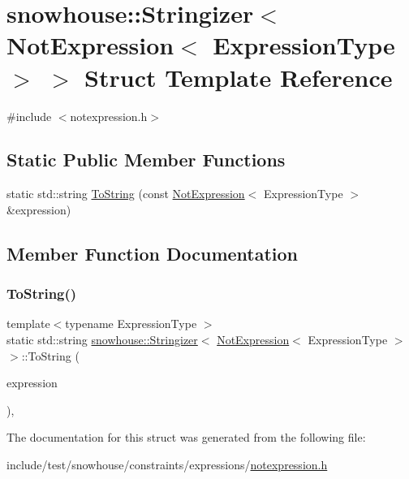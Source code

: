 \hypertarget{structsnowhouse_1_1Stringizer_3_01NotExpression_3_01ExpressionType_01_4_01_4}{}\section{snowhouse\+::Stringizer$<$ Not\+Expression$<$ Expression\+Type $>$ $>$ Struct Template Reference}
\label{structsnowhouse_1_1Stringizer_3_01NotExpression_3_01ExpressionType_01_4_01_4}


{\ttfamily \#include $<$notexpression.\+h$>$}

\subsection*{Static Public Member Functions}
\begin{DoxyCompactItemize}
\item 
static std\+::string \mbox{\hyperlink{structsnowhouse_1_1Stringizer_3_01NotExpression_3_01ExpressionType_01_4_01_4_a908c1fe0ea46f2ea3bcacea90009001f}{To\+String}} (const \mbox{\hyperlink{structsnowhouse_1_1NotExpression}{Not\+Expression}}$<$ Expression\+Type $>$ \&expression)
\end{DoxyCompactItemize}


\subsection{Member Function Documentation}
\mbox{\label{structsnowhouse_1_1Stringizer_3_01NotExpression_3_01ExpressionType_01_4_01_4_a908c1fe0ea46f2ea3bcacea90009001f}} 
\subsubsection{\texorpdfstring{ToString()}{ToString()}}
{\footnotesize\ttfamily template$<$typename Expression\+Type $>$ \\
static std\+::string \mbox{\hyperlink{structsnowhouse_1_1Stringizer}{snowhouse\+::\+Stringizer}}$<$ \mbox{\hyperlink{structsnowhouse_1_1NotExpression}{Not\+Expression}}$<$ Expression\+Type $>$ $>$\+::To\+String (\begin{DoxyParamCaption}\item[{const \mbox{\hyperlink{structsnowhouse_1_1NotExpression}{Not\+Expression}}$<$ Expression\+Type $>$ \&}]{expression }\end{DoxyParamCaption})\hspace{0.3cm}{\ttfamily [inline]}, {\ttfamily [static]}}



The documentation for this struct was generated from the following file\+:\begin{DoxyCompactItemize}
\item 
include/test/snowhouse/constraints/expressions/\mbox{\hyperlink{notexpression_8h}{notexpression.\+h}}\end{DoxyCompactItemize}
